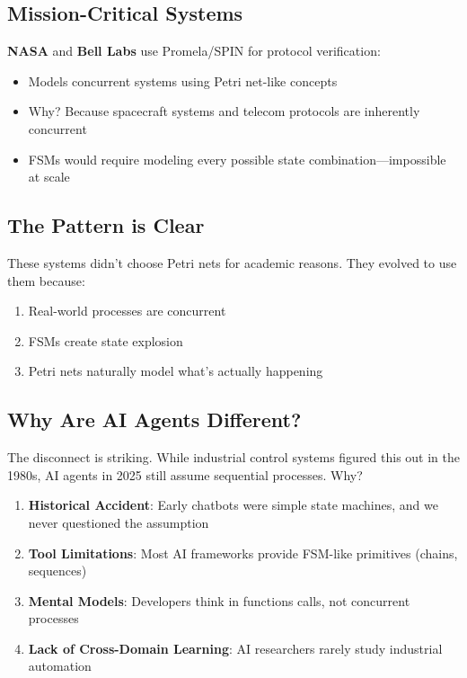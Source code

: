 \documentclass[11pt,a4paper]{article}
\begin{document}
\subsection{Mission-Critical Systems}
\textbf{NASA} and \textbf{Bell Labs} use Promela/SPIN for protocol verification:
\begin{itemize}
\item Models concurrent systems using Petri net-like concepts
\item Why? Because spacecraft systems and telecom protocols are inherently concurrent
\item FSMs would require modeling every possible state combination—impossible at scale
\end{itemize}

\subsection{The Pattern is Clear}

These systems didn't choose Petri nets for academic reasons. They evolved to use them because:
\begin{enumerate}
\item Real-world processes are concurrent
\item FSMs create state explosion
\item Petri nets naturally model what's actually happening
\end{enumerate}

\subsection{Why Are AI Agents Different?}

The disconnect is striking. While industrial control systems figured this out in the 1980s, AI agents in 2025 still assume sequential processes. Why?

\begin{enumerate}
\item \textbf{Historical Accident}: Early chatbots were simple state machines, and we never questioned the assumption
\item \textbf{Tool Limitations}: Most AI frameworks provide FSM-like primitives (chains, sequences)
\item \textbf{Mental Models}: Developers think in functions calls, not concurrent processes
\item \textbf{Lack of Cross-Domain Learning}: AI researchers rarely study industrial automation
\end{enumerate}
\end{document}
